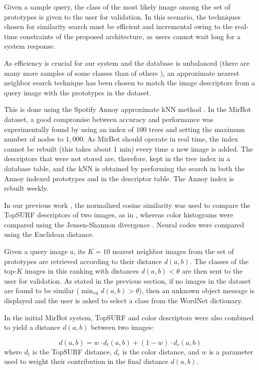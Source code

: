 \documentclass[final, twocolumn]{elsarticle}
\begin{document}
Given a sample query, the class of the most likely image among the set of prototypes is given to the user for validation. In this scenario, the techniques chosen for similarity search must be efficient and incremental owing to the real-time constraints of the proposed architecture, as users cannot wait long for a system response.

As efficiency is crucial for our system and the database is unbalanced (there are many more samples of some classes than of others \cite{He09}), an approximate nearest neighbor search technique has been chosen to match the image descriptors from a query image with the prototypes in the dataset.

This is done using the Spotify Annoy approximate kNN method \cite{annoy}. In the MirBot dataset, a good compromise between accuracy and performance was experimentally found by using an index of $100$ trees and setting the maximum number of nodes to $1,000$. As MirBot should operate in real time, the index cannot be rebuilt (this takes about 1 min) every time a new image is added. The descriptors that were not stored are, therefore, kept in the tree index in a database table, and the kNN is obtained by performing the search in both the Annoy indexed prototypes and in the descriptor table. The Annoy index is rebuilt weekly.

In our previous work \cite{MirBot:System}, the normalized cosine similarity was used to compare the TopSURF descriptors of two images, as in \cite{Thomee2010TOP-SURF:Toolkit}, whereas color histograms were compared using the Jensen-Shannon divergence \citep{Lin1991DivergenceEntropy}. Neural codes were compared using the Euclidean distance.

Given a query image $a$, its $K=10$ nearest neighbor images from the set of prototypes are retrieved according to their distance $d(a,b)$. The classes of the top-$K$ images in this ranking with distances $d(a,b)<\theta$  are then sent to the user for validation. As stated in the previous section, if no images in the dataset are found to be similar ($\min_{\forall{b}} {d(a,b)>\theta}$), then an unknown object message is displayed and the user is asked to select a class from the WordNet dictionary.

In the initial MirBot system, TopSURF and color descriptors were also combined to yield a distance $d(a,b)$ between two images:

\begin{equation}
\label{eqWeight}
d(a,b)=w \cdot d_{t}(a,b) + (1-w) \cdot d_{c}(a,b)
\end{equation}\noindent where $d_t$ is the TopSURF distance, $d_c$ is the color distance, and $w$ is a parameter used to weight their contribution in the final distance $d(a,b)$.
\end{document}
